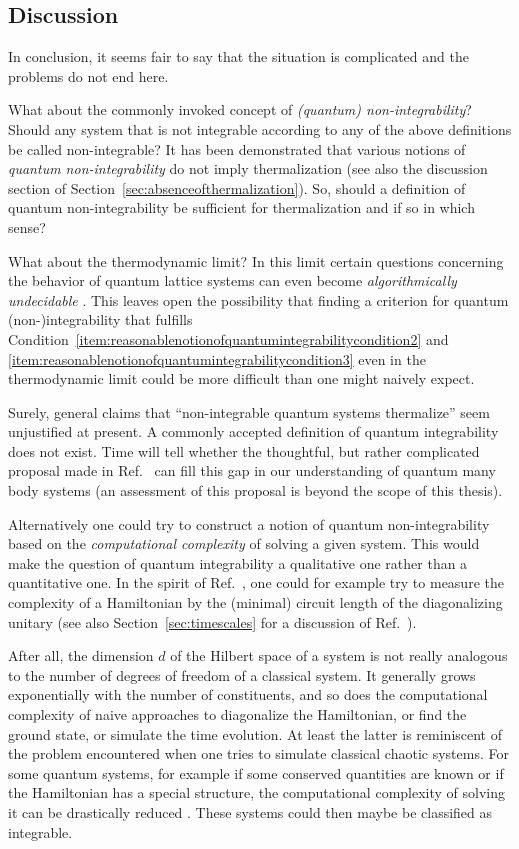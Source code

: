 \documentclass[a4paper,12pt,listof=totoc,index=totoc,bibliography=totoc,headsepline=false,headings=normal,BCOR16.153846mm,DIV12,headinclude,twoside,cleardoublepage=empty,numbers=noenddot,final]{scrreprt}
\theoremstyle{mystyle}
\numberwithin{equation}{section}
\numberwithin{figure}{section}
\numberwithin{lemma}{section}
\numberwithin{theorem}{section}
\numberwithin{corollary}{section}
\numberwithin{definition}{section}
\numberwithin{conjecture}{section}
\numberwithin{observation}{section}
\newcommand{\+}{\mkern2mu}
\DeclareMathOperator{\1}{\mathds{1}}
\begin{document}
\subsection*{Discussion}
%
In conclusion, it seems fair to say that the situation is complicated and the problems do not end here.

What about the commonly invoked concept of \emph{(quantum) non-integrability}?
Should any system that is not integrable according to any of the above definitions be called non-integrable?
It has been demonstrated that various notions of \emph{quantum non-integrability} do not imply thermalization \cite{Larson13,PhysRevLett.10-6} (see also the discussion section of Section~\ref{sec:absenceofthermalization}).
So, should a definition of quantum non-integrability be sufficient for thermalization and if so in which sense?

What about the thermodynamic limit?
In this limit certain questions concerning the behavior of quantum lattice systems can even become \emph{algorithmically undecidable} \cite{Cubitt2011}.
This leaves open the possibility that finding a criterion for quantum \mbox{(non-)}integrability that fulfills Condition~\ref{item:reasonablenotionofquantumintegrabilitycondition2} and \ref{item:reasonablenotionofquantumintegrabilitycondition3} even in the thermodynamic limit could be more difficult than one might naively expect.

Surely, general claims that ``non-integrable quantum systems thermalize'' seem unjustified at present.
A commonly accepted definition of quantum integrability does not exist.
Time will tell whether the thoughtful, but rather complicated proposal made in Ref.~\cite{1012.3587v1} can fill this gap in our understanding of quantum many body systems (an assessment of this proposal is beyond the scope of this thesis).

Alternatively one could try to construct a notion of quantum non-integrability based on the \emph{computational complexity} of solving a given system.
This would make the question of quantum integrability a qualitative one rather than a quantitative one.
In the spirit of Ref.~\cite{1108.0374}, one could for example try to measure the complexity of a Hamiltonian by the (minimal) circuit length of the diagonalizing unitary (see also Section~\ref{sec:timescales} for a discussion of Ref.~\cite{1108.0374}).

After all, the dimension $d$ of the Hilbert space of a system is not really analogous to the number of degrees of freedom of a classical system.
It generally grows exponentially with the number of constituents, and so does the computational complexity of naive approaches to diagonalize the Hamiltonian, or find the ground state, or simulate the time evolution.
At least the latter is reminiscent of the problem encountered when one tries to simulate classical chaotic systems.
For some quantum systems, for example if some conserved quantities are known or if the Hamiltonian has a special structure, the computational complexity of solving it can be drastically reduced \cite{Anders2003,Braunstein2005,Adesso2007,White1992,Schollwock2005,Hallberg2006}.
These systems could then maybe be classified as integrable.
\end{document}
